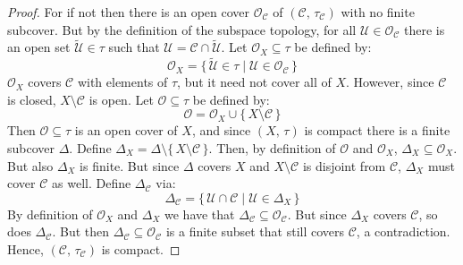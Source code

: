 \documentclass{article}
\theoremstyle{plain}
\theoremstyle{normal}
\begin{document}
        \begin{proof}
            For if not then there is an open cover $\mathcal{O}_{\mathcal{C}}$
            of $(\mathcal{C},\,\tau_{\mathcal{C}})$ with no finite subcover.
            But by the definition of the subspace topology, for all
            $\mathcal{U}\in\mathcal{O}_{\mathcal{C}}$
            there is an open set $\tilde{\mathcal{U}}\in\tau$ such that
            $\mathcal{U}=\mathcal{C}\cap\tilde{\mathcal{U}}$. Let
            $\mathcal{O}_{X}\subseteq\tau$ be defined by:
            \begin{equation}
                \mathcal{O}_{X}
                =\{\,\tilde{\mathcal{U}}\in\tau\;|\;
                    \mathcal{U}\in\mathcal{O}_{\mathcal{C}}\,\}
            \end{equation}
            $\mathcal{O}_{X}$ covers $\mathcal{C}$ with elements of $\tau$, but
            it need not cover all of $X$. However, since $\mathcal{C}$ is
            closed, $X\setminus\mathcal{C}$ is open. Let
            $\mathcal{O}\subseteq\tau$ be defined by:
            \begin{equation}
                \mathcal{O}=\mathcal{O}_{X}\cup\{\,X\setminus\mathcal{C}\,\}
            \end{equation}
            Then $\mathcal{O}\subseteq\tau$ is an open cover of $X$, and since
            $(X,\,\tau)$ is compact there is a finite subcover $\Delta$.
            Define $\Delta_{X}=\Delta\setminus\{\,X\setminus\mathcal{C}\,\}$.
            Then, by definition of $\mathcal{O}$ and $\mathcal{O}_{X}$,
            $\Delta_{X}\subseteq\mathcal{O}_{X}$. But also $\Delta_{X}$ is
            finite. But since $\Delta$ covers $X$ and $X\setminus\mathcal{C}$
            is disjoint from $\mathcal{C}$, $\Delta_{X}$ must cover
            $\mathcal{C}$ as well. Define $\Delta_{\mathcal{C}}$ via:
            \begin{equation}
                \Delta_{\mathcal{C}}=
                \{\,\mathcal{U}\cap\mathcal{C}\;|\;\mathcal{U}\in\Delta_{X}\,\}
            \end{equation}
            By definition of $\mathcal{O}_{X}$ and $\Delta_{X}$ we have that
            $\Delta_{\mathcal{C}}\subseteq\mathcal{O}_{\mathcal{C}}$. But since
            $\Delta_{X}$ covers $\mathcal{C}$, so does $\Delta_{\mathcal{C}}$.
            But then $\Delta_{\mathcal{C}}\subseteq\mathcal{O}_{\mathcal{C}}$
            is a finite subset that still covers $\mathcal{C}$, a contradiction.
            Hence, $(\mathcal{C},\,\tau_{\mathcal{C}})$ is compact.
        \end{proof}
\end{document}
